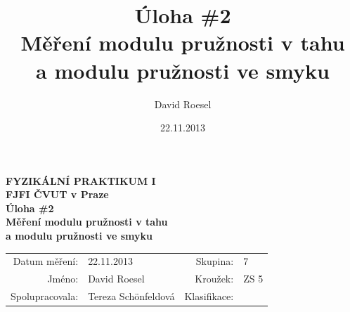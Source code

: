 \documentclass[english]{article}
\newcommand{\Author}{David Roesel}
\newcommand{\Coauthor}{Tereza Schönfeldová}
\newcommand{\Institute}{FJFI ČVUT v Praze}
\newcommand{\Subject}{FYZIKÁLNÍ PRAKTIKUM I}
\newcommand{\Group}{7}
\newcommand{\Circle}{ZS 5}
\newcommand{\Title}{Úloha \#2  \\Měření modulu pružnosti v tahu \\ a modulu pružnosti ve smyku}
\newcommand{\Date}{22.11.2013}
\begin{document}
\author{\Author}
\title{\Title}
\date{\Date}

\renewcommand{\figurename}{Obr.}
\renewcommand{\tablename}{Tab.}
\renewcommand{\refname}{Reference}


\setlength{\parindent}{0cm}
\begin{multicols}{2}
\textbf{\Subject \\
        \Institute \\[0.1cm]
\Title \\[0.5cm]
}
\begin{tabular}{rlrl}
\large Datum měření: & \Date & \large Skupina: & \Group \\
\large Jméno: & \Author & \large Kroužek:  & \Circle\\
\large Spolupracovala: & \Coauthor &\large Klasifikace:\\
\end{tabular}


\end{multicols}
\end{document}
